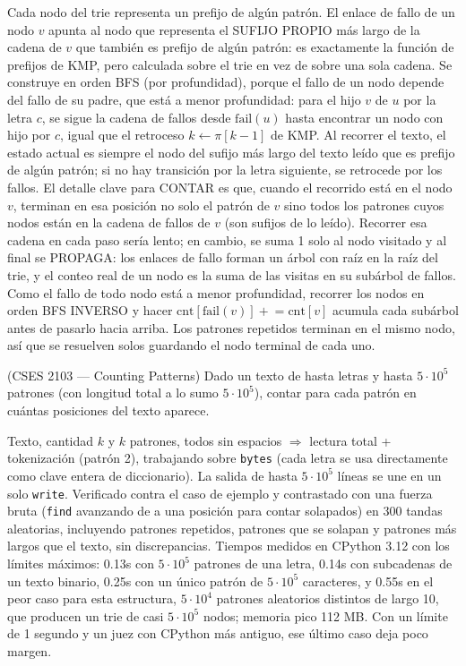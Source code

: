  Cada nodo del trie representa un prefijo de algún patrón. El enlace de fallo de un nodo $v$ apunta al nodo que representa el SUFIJO PROPIO más largo de la cadena de $v$ que también es prefijo de algún patrón: es exactamente la función de prefijos de KMP, pero calculada sobre el trie en vez de sobre una sola cadena. Se construye en orden BFS (por profundidad), porque el fallo de un nodo depende del fallo de su padre, que está a menor profundidad: para el hijo $v$ de $u$ por la letra $c$, se sigue la cadena de fallos desde $\mathrm{fail}(u)$ hasta encontrar un nodo con hijo por $c$, igual que el retroceso $k \leftarrow \pi[k-1]$ de KMP. Al recorrer el texto, el estado actual es siempre el nodo del sufijo más largo del texto leído que es prefijo de algún patrón; si no hay transición por la letra siguiente, se retrocede por los fallos. El detalle clave para CONTAR es que, cuando el recorrido está en el nodo $v$, terminan en esa posición no solo el patrón de $v$ sino todos los patrones cuyos nodos están en la cadena de fallos de $v$ (son sufijos de lo leído). Recorrer esa cadena en cada paso sería lento; en cambio, se suma 1 solo al nodo visitado y al final se PROPAGA: los enlaces de fallo forman un árbol con raíz en la raíz del trie, y el conteo real de un nodo es la suma de las visitas en su subárbol de fallos. Como el fallo de todo nodo está a menor profundidad, recorrer los nodos en orden BFS INVERSO y hacer $\mathrm{cnt}[\mathrm{fail}(v)] \mathrel{+}= \mathrm{cnt}[v]$ acumula cada subárbol antes de pasarlo hacia arriba. Los patrones repetidos terminan en el mismo nodo, así que se resuelven solos guardando el nodo terminal de cada uno.~\cite{aho1975}


(CSES 2103 — Counting Patterns) Dado un texto de hasta  letras y hasta $5\cdot10^5$ patrones (con longitud total a lo sumo $5\cdot10^5$), contar para cada patrón en cuántas posiciones del texto aparece.

 Texto, cantidad $k$ y $k$ patrones, todos sin espacios $\Rightarrow$ lectura total + tokenización (patrón 2), trabajando sobre \texttt{bytes} (cada letra se usa directamente como clave entera de diccionario). La salida de hasta $5\cdot10^5$ líneas se une en un solo \texttt{write}. Verificado contra el caso de ejemplo y contrastado con una fuerza bruta (\texttt{find} avanzando de a una posición para contar solapados) en 300 tandas aleatorias, incluyendo patrones repetidos, patrones que se solapan y patrones más largos que el texto, sin discrepancias. Tiempos medidos en CPython 3.12 con los límites máximos: \aprox{}0.13s con $5\cdot10^5$ patrones de una letra, \aprox{}0.14s con subcadenas de un texto binario, \aprox{}0.25s con un único patrón de $5\cdot10^5$ caracteres, y \aprox{}0.55s en el peor caso para esta estructura, $5\cdot10^4$ patrones aleatorios distintos de largo 10, que producen un trie de casi $5\cdot10^5$ nodos; memoria pico \aprox{}112 MB. Con un límite de 1 segundo y un juez con CPython más antiguo, ese último caso deja poco margen.

